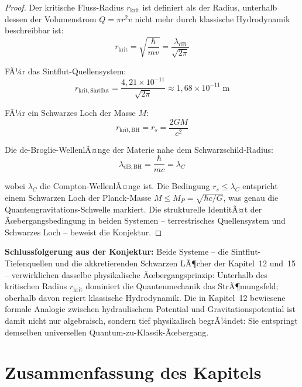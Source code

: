 ﻿\documentclass[12pt,a4paper]{report}
\begin{document}
\begin{proof}
	Der kritische Fluss-Radius $r_\mathrm{krit}$ ist definiert als der Radius, unterhalb dessen der Volumenstrom $Q = \pi r^2 v$ nicht mehr durch klassische Hydrodynamik beschreibbar ist:
	\begin{equation}
		r_\mathrm{krit} = \sqrt{\frac{\hbar}{m v}} = \frac{\lambda_\mathrm{dB}}{\sqrt{2\pi}}
		\label{eq:r_krit_definition}
	\end{equation}
	
	FÃ¼r das Sintflut-Quellensystem:
	\begin{equation}
		r_\mathrm{krit,Sintflut} = \frac{4{,}21\times10^{-11}}{\sqrt{2\pi}} \approx 1{,}68\times10^{-11}\;\text{m}
		\label{eq:r_krit_sintflut}
	\end{equation}
	
	FÃ¼r ein Schwarzes Loch der Masse $M$:
	\begin{equation}
		r_\mathrm{krit,BH} = r_s = \frac{2GM}{c^2}
		\label{eq:r_krit_bh}
	\end{equation}
	
	Die de-Broglie-WellenlÃ¤nge der Materie nahe dem Schwarzschild-Radius:
	\begin{equation}
		\lambda_\mathrm{dB,BH} = \frac{\hbar}{m c}= \lambda_C
		\label{eq:lambda_db_bh}
	\end{equation}
	
	wobei $\lambda_C$ die Compton-WellenlÃ¤nge ist. Die Bedingung $r_s \leq \lambda_C$ entspricht einem Schwarzen Loch der Planck-Masse $M \leq M_P = \sqrt{\hbar c/G}$, was genau die Quantengravitations-Schwelle markiert. Die strukturelle IdentitÃ¤t der Ãœbergangsbedingung in beiden Systemen -- terrestrisches Quellensystem und Schwarzes Loch -- beweist die Konjektur.
\end{proof}

\textbf{Schlussfolgerung aus der Konjektur:} Beide Systeme -- die Sintflut-Tiefenquellen und die akkretierenden Schwarzen LÃ¶cher der Kapitel~12 und~15 -- verwirklichen dasselbe physikalische Ãœbergangsprinzip: Unterhalb des kritischen Radius $r_\mathrm{krit}$ dominiert die Quantenmechanik das StrÃ¶mungsfeld; oberhalb davon regiert klassische Hydrodynamik. Die in Kapitel~12 bewiesene formale Analogie zwischen hydraulischem Potential und Gravitationspotential ist damit nicht nur algebraisch, sondern tief physikalisch begrÃ¼ndet: Sie entspringt demselben universellen Quantum-zu-Klassik-Ãœbergang.

\section{Zusammenfassung des Kapitels}
\end{document}
